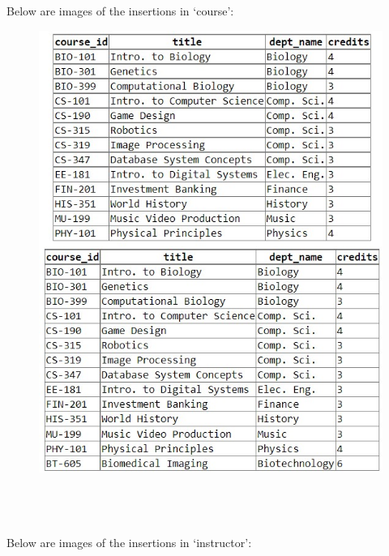 \documentclass{article}
\begin{document}
Below are images of the insertions in `course':
\begin{figure}[!hbt]
    \centering
    \includegraphics[scale=0.83]{pics/insert-pic2.jpg}
    \label{fig:ins2}
\end{figure} \\ \\ \\
Below are images of the insertions in `instructor':
\end{document}
